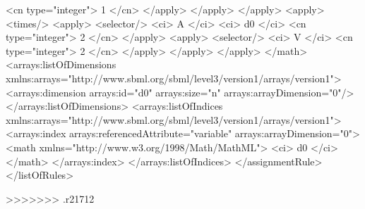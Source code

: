\begin{example}
                            <cn type="integer"> 1 </cn>
                        </apply>
                    </apply>
                </apply>
                <apply>
                    <times/>
                    <apply>
                        <selector/>
                        <ci> A </ci>
                        <ci> d0 </ci>
                        <cn type="integer"> 2 </cn>
                    </apply>
                    <apply>
                        <selector/>
                        <ci> V </ci>
                        <cn type="integer"> 2 </cn>
                    </apply>
                </apply>
            </apply>
        </math>
        <arrays:listOfDimensions
            xmlns:arrays="http://www.sbml.org/sbml/level3/version1/arrays/version1">
            <arrays:dimension arrays:id="d0" arrays:size="n" arrays:arrayDimension="0"/>
        </arrays:listOfDimensions>
        <arrays:listOfIndices
            xmlns:arrays="http://www.sbml.org/sbml/level3/version1/arrays/version1">
            <arrays:index arrays:referencedAttribute="variable" arrays:arrayDimension="0">
                <math xmlns="http://www.w3.org/1998/Math/MathML">
                    <ci> d0 </ci>
                </math>
            </arrays:index>
        </arrays:listOfIndices>
    </assignmentRule>
</listOfRules>
\end{example}

>>>>>>> .r21712




